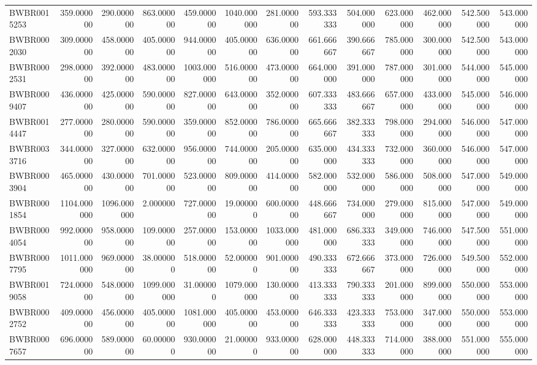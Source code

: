 \begin{longtable}{lrrrrrrrrrrrr}
BWBR0015253 & 359.000000 & 290.000000 & 863.000000 & 459.000000 & 1040.000000 & 281.000000 & 593.333333 & 504.000000 & 623.000000 & 462.000000 & 542.500000 & 543.000000 \\
BWBR0002030 & 309.000000 & 458.000000 & 405.000000 & 944.000000 & 405.000000 & 636.000000 & 661.666667 & 390.666667 & 785.000000 & 300.000000 & 542.500000 & 543.000000 \\
BWBR0002531 & 298.000000 & 392.000000 & 483.000000 & 1003.000000 & 516.000000 & 473.000000 & 664.000000 & 391.000000 & 787.000000 & 301.000000 & 544.000000 & 545.000000 \\
BWBR0009407 & 436.000000 & 425.000000 & 590.000000 & 827.000000 & 643.000000 & 352.000000 & 607.333333 & 483.666667 & 657.000000 & 433.000000 & 545.000000 & 546.000000 \\
BWBR0014447 & 277.000000 & 280.000000 & 590.000000 & 359.000000 & 852.000000 & 786.000000 & 665.666667 & 382.333333 & 798.000000 & 294.000000 & 546.000000 & 547.000000 \\
BWBR0033716 & 344.000000 & 327.000000 & 632.000000 & 956.000000 & 744.000000 & 205.000000 & 635.000000 & 434.333333 & 732.000000 & 360.000000 & 546.000000 & 547.000000 \\
BWBR0003904 & 465.000000 & 430.000000 & 701.000000 & 523.000000 & 809.000000 & 414.000000 & 582.000000 & 532.000000 & 586.000000 & 508.000000 & 547.000000 & 549.000000 \\
BWBR0001854 & 1104.000000 & 1096.000000 & 2.000000 & 727.000000 & 19.000000 & 600.000000 & 448.666667 & 734.000000 & 279.000000 & 815.000000 & 547.000000 & 549.000000 \\
BWBR0004054 & 992.000000 & 958.000000 & 109.000000 & 257.000000 & 153.000000 & 1033.000000 & 481.000000 & 686.333333 & 349.000000 & 746.000000 & 547.500000 & 551.000000 \\
BWBR0007795 & 1011.000000 & 969.000000 & 38.000000 & 518.000000 & 52.000000 & 901.000000 & 490.333333 & 672.666667 & 373.000000 & 726.000000 & 549.500000 & 552.000000 \\
BWBR0019058 & 724.000000 & 548.000000 & 1099.000000 & 31.000000 & 1079.000000 & 130.000000 & 413.333333 & 790.333333 & 201.000000 & 899.000000 & 550.000000 & 553.000000 \\
BWBR0002752 & 409.000000 & 456.000000 & 405.000000 & 1081.000000 & 405.000000 & 453.000000 & 646.333333 & 423.333333 & 753.000000 & 347.000000 & 550.000000 & 553.000000 \\
BWBR0007657 & 696.000000 & 589.000000 & 60.000000 & 930.000000 & 21.000000 & 933.000000 & 628.000000 & 448.333333 & 714.000000 & 388.000000 & 551.000000 & 555.000000 \\

\end{longtable}
